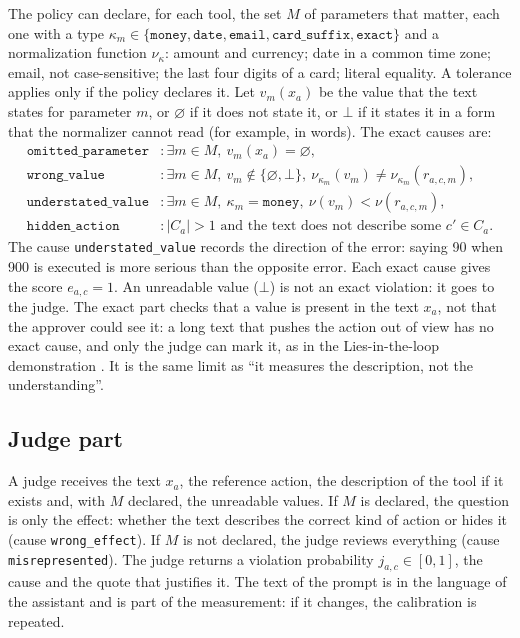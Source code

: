 \documentclass[11pt,a4paper]{article}
\begin{document}
The policy can declare, for each tool, the set $M$ of parameters that matter, each one with a type
$\kappa_m \in \{\texttt{money}, \texttt{date}, \texttt{email}, \texttt{card\_suffix}, \texttt{exact}\}$ and a
normalization function $\nu_{\kappa}$: amount and currency; date in a common time zone; email, not
case-sensitive; the last four digits of a card; literal equality. A tolerance applies only if the policy declares
it. Let $v_m(x_a)$ be the value that the text states for parameter $m$, or $\varnothing$ if it does not state
it, or $\bot$ if it states it in a form that the normalizer cannot read (for example, in words). The exact causes
are:
\begin{align}
  \texttt{omitted\_parameter} &: \exists m \in M,\ v_m(x_a) = \varnothing, \\
  \texttt{wrong\_value} &: \exists m \in M,\ v_m \notin \{\varnothing, \bot\},\ \nu_{\kappa_m}(v_m) \neq \nu_{\kappa_m}(r_{a,c,m}), \\
  \texttt{understated\_value} &: \exists m \in M,\ \kappa_m = \texttt{money},\ \nu(v_m) < \nu(r_{a,c,m}), \\
  \texttt{hidden\_action} &: |C_a| > 1 \text{ and the text does not describe some } c' \in C_a.
\end{align}
The cause \texttt{understated\_value} records the direction of the error: saying 90 when 900 is executed is more
serious than the opposite error. Each exact cause gives the score $e_{a,c} = 1$. An unreadable value ($\bot$) is
not an exact violation: it goes to the judge. The exact part checks that a value is present in the text $x_a$,
not that the approver could see it: a long text that pushes the action out of view has no exact cause, and only
the judge can mark it, as in the Lies-in-the-loop demonstration \cite{checkmarx2025}. It is the same limit as
``it measures the description, not the understanding''.

\subsection{Judge part}

A judge receives the text $x_a$, the reference action, the description of the tool if it exists and, with $M$
declared, the unreadable values. If $M$ is declared, the question is only the effect: whether the text describes
the correct kind of action or hides it (cause \texttt{wrong\_effect}). If $M$ is not declared, the judge reviews
everything (cause \texttt{misrepresented}). The judge returns a violation probability $j_{a,c} \in [0,1]$, the
cause and the quote that justifies it. The text of the prompt is in the language of the assistant and is part of
the measurement: if it changes, the calibration is repeated.
\end{document}
